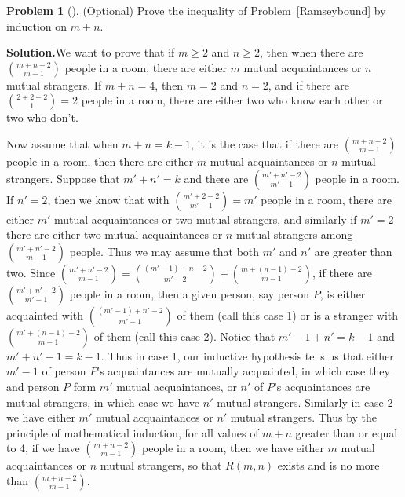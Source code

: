 \documentclass[10pt,]{book}
\theoremstyle{plain}
\theoremstyle{definition}
\newtheorem{activity}[project]{Problem}
\theoremstyle{definition}
\numberwithin{equation}{chapter}
\begin{document}
\begin{activity}[]\label{activity-84}
(Optional) Prove the inequality of \hyperref[Ramseybound]{Problem~\ref{Ramseybound}} by induction on \(m+n\).%
\par\medskip\noindent%
\textbf{Solution.}\quad We want to prove that if \(m\ge 2\) and \(n\ge 2\), then when there are \(\binom{m+n-2}{m-1}\) people in a room, there are either \(m\) mutual acquaintances or \(n\) mutual strangers. If \(m+n=4\), then \(m=2\) and \(n=2\), and if there are \(\binom{2+2-2}{1}=2\) people in a room, there are either two who know each other or two who don't.%
\par
Now assume that when \(m+n=k-1\), it is the case that if there are \(\binom{m+n-2}{m-1}\) people in a room, then there are either \(m\) mutual acquaintances or \(n\) mutual strangers. Suppose that \(m'+n'=k\) and there are \(\binom{m'+n'-2}{m'-1}\) people in a room. If \(n'=2\), then we know that with \(\binom{m'+2-2}{m'-1}=m'\) people in a room, there are either \(m'\) mutual acquaintances or two mutual strangers, and similarly if \(m'=2\) there are either two mutual acquaintances or \(n\) mutual strangers among \(\binom{m'+n'-2}{m-1}\) people. Thus we may assume that both \(m'\) and \(n'\) are greater than two. Since \(\binom{m'+n'-2}{m-1}=
\binom{(m'-1)+n-2}{m'-2} +\binom{m+(n-1) -2}{m-1}\), if there are \(\binom{m'+n'-2}{m'-1}\) people in a room, then a given person, say person \(P\), is either acquainted with \(\binom{(m'-1)+n'-2}{m'-1}\) of them (call this case 1) or is a stranger with \(\binom{m'+(n-1)-2}{m-1}\) of them (call this case 2). Notice that \(m'-1+n'=k-1\) and \(m'+n'-1=k-1\). Thus in case 1, our inductive hypothesis tells us that either \(m'-1\) of person \(P\)'s acquaintances are mutually acquainted, in which case they and person \(P\) form \(m'\) mutual acquaintances, or \(n'\) of \(P\)'s acquaintances are mutual strangers, in which case we have \(n'\) mutual strangers. Similarly in case 2 we have either \(m'\) mutual acquaintances or \(n'\) mutual strangers. Thus by the principle of mathematical induction, for all values of \(m+n\) greater than or equal to 4, if we have \(\binom{m+n-2}{m-1}\) people in a room, then we have either \(m\) mutual acquaintances or \(n\) mutual strangers, so that \(R(m,n)\) exists and is no more than \(\binom{m+n-2}{m-1}\).%
\end{activity}
\end{document}
